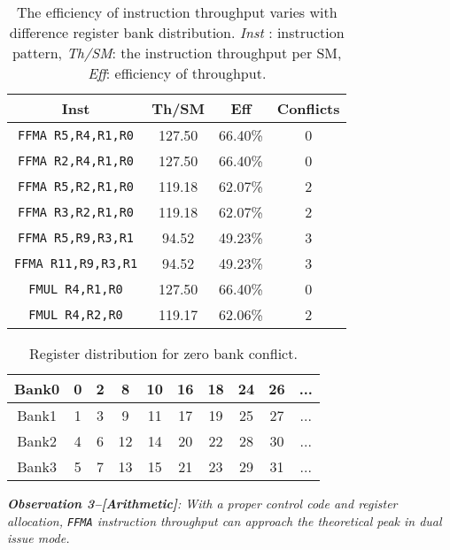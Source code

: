 \begin{table}[htbp]
\caption{The efficiency of instruction throughput varies with difference register bank distribution. {\it Inst} : instruction pattern, {\it Th/SM}: the instruction throughput per SM, {\it Eff}: efficiency of throughput.}
\centering
\scalebox{1.0} {
\begin{tabular}{|c||c|c|c|}
\hline
Inst &Th/SM&Eff&Conflicts \\
\hline
{\tt FFMA R5,R4,R1,R0}&127.50&66.40\%&0\\
\hline
{\tt FFMA R2,R4,R1,R0}&127.50&66.40\%&0\\
\hline
{\tt FFMA R5,R2,R1,R0}&119.18&62.07\%&2\\
\hline
{\tt FFMA R3,R2,R1,R0}&119.18&62.07\%&2\\
\hline
{\tt FFMA R5,R9,R3,R1}&94.52&49.23\%&3\\
\hline
{\tt FFMA R11,R9,R3,R1}&94.52&49.23\%&3\\
\hline
{\tt FMUL R4,R1,R0}&127.50&66.40\%&0\\
\hline
{\tt FMUL R4,R2,R0}&119.17&62.06\%&2\\
\hline
\end{tabular}
}
\label{tab:th}
\end{table}


\begin{table}[htbp]
\caption{Register distribution for zero bank conflict.}
\centering
\scalebox{1.0} {
\begin{tabular}{|c||c|c|c|c|c|c|c|c|c|}
\hline
Bank0&0&2&8&10&16&18&24&26&... \\
\hline
Bank1&1&3&9&11&17&19&25&27&... \\
\hline
Bank2&4&6&12&14&20&22&28&30&... \\
\hline
Bank3&5&7&13&15&21&23&29&31&...\\
\hline
\end{tabular}
}
\label{tab:reg}
\end{table}

{\em {\bf Observation 3--[Arithmetic]}: With a proper control code and register allocation, {\tt FFMA} instruction throughput can approach the theoretical peak in dual issue mode.}

